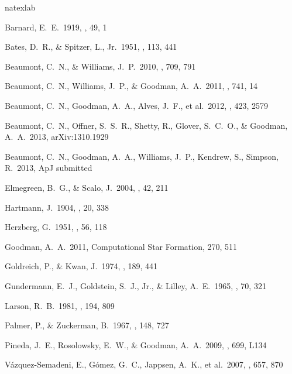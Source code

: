 \begin{thebibliography}{16}
\expandafter\ifx\csname natexlab\endcsname\relax\def\natexlab#1{#1}\fi

 Barnard, E.~E.\ 1919, \apj, 
49, 1 

 Bates, D.~R., \& Spitzer, L., Jr.\ 1951, \apj, 113, 441

 Beaumont, C.~N., \& Williams, J.~P.\ 2010, \apj, 709, 791 


 Beaumont, C.~N., 
Williams, J.~P., \& Goodman, A.~A.\ 2011, \apj, 741, 14 


 Beaumont, C.~N., 
Goodman, A.~A., Alves, J.~F., et al.\ 2012, \mnras, 423, 2579 

 Beaumont, C.~N., 
Offner, S.~S.~R., Shetty, R., Glover, S.~C.~O., 
\& Goodman, A.~A.\ 2013, arXiv:1310.1929 

 Beaumont, C.~N., 
Goodman, A.~A., Williams, J.~P., Kendrew, S., Simpson, R.\ 2013, ApJ submitted 

 Elmegreen, B.~G., \& Scalo, J.\ 2004, \araa, 42, 211 

 Hartmann, J.\ 1904, \apj, 20,  338 

 Herzberg, G.\ 1951, \aj, 56, 118 

 Goodman, A.~A.\ 2011,  Computational Star Formation, 270, 511

 Goldreich, P., \& Kwan, J.\ 1974, \apj, 189, 441 

 Gundermann, E.~J., 
Goldstein, S.~J., Jr., \& Lilley, A.~E.\ 1965, \aj, 70, 321 

 Larson, R.~B.\ 1981, \mnras, 
194, 809

 Palmer, P., \& Zuckerman, B.\ 1967, \apj, 148, 727 

 Pineda, J.~E., 
Rosolowsky, E.~W., \& Goodman, A.~A.\ 2009, \apjl, 699, L134

V{\'a}zquez-Semadeni, E., G{\'o}mez, G.~C., Jappsen, A.~K., et al.\ 2007, 
\apj, 657, 870 


\end{thebibliography}
